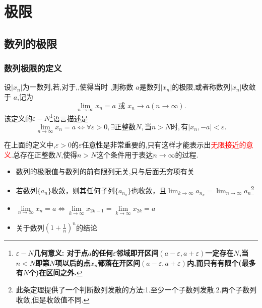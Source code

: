 \documentclass[12pt, a4paper, oneside, UTF8]{ctexbook}
\begin{document}
\begin{sloppypar}
    \else
    \fi
    \chapter{极限}
    \section{数列的极限}
    \subsection{数列极限的定义}
    \begin{defn}{}{}
        设$|x_n|$为一数列,若,对于,,使得当时 ,则称数 $a$是数列$| x_n |$的极限,或者称数列$| x_n |$收敛于 $a$,记为
        $$
            \lim_{n\to\infty}x_n=a\text{ 或 }x_n\to a(n\to\infty).
        $$
        该定义的$\varepsilon-N$\footnote{$\varepsilon - N$\textbf{几何意义: 对于点$a$的任何$\varepsilon$邻域即开区间$(a-\varepsilon,a+\varepsilon)$一定存在$N$,当$n < N$即第$N$项以后的点$x_n$都落在开区间$(a-\varepsilon,a+\varepsilon)$内,而只有有限个(最多有$N$个)在区间之外.}}语言描述是
        \\
        $$\lim_{n\to\infty}x_n=a\Leftrightarrow\forall\varepsilon>0,\exists\text{正整数}N,\text{当}n>N\text{时},\text{有}|x_n,-a|<\varepsilon.$$
    \end{defn}
    在上面的定义中,$\varepsilon>0$的$\varepsilon$任意性是非常重要的,只有这样才能表示出\textcolor{red}{无限接近的意义}.总存在正整数$N$,使得$n>N$这个条件用于表达$n \to \infty$的过程.
    \begin{criterion}{}{}
        \begin{itemize}
            \item 数列的极限值与数列的前有限列无关,只与后面无穷项有关
            \item 若数列$\{a_n\}$收敛，则其任何子列$\{a_{n_k}\}$也收敛，且$\lim_{k\to\infty}a_{n_k}=\lim_{n\to\infty}a_n$\footnote{ 此条定理提供了一个判断数列发散的方法:1.至少一个子数列发散.2.两个子数列收敛,但是收敛值不同.}
            \item $\underset{n\to\infty}{\operatorname*{\lim}}x_n=a\Leftrightarrow\underset{k\to\infty}{\operatorname*{\lim}}x_{2k-1}=\underset{k\to\infty}{\operatorname*{\lim}}x_{2k}=a$
            \item 关于数列$(1+\frac{1}{n})^n$的结论

\end{itemize}
\end{criterion}
\end{sloppypar}
\end{document}
